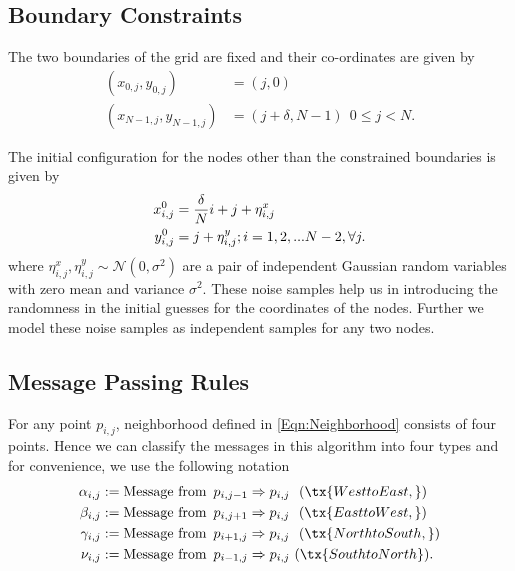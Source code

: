 \documentclass[journal, onecolumn]{IEEEtran}
\begin{document}
\subsection{Boundary Constraints}
The two boundaries of the grid are fixed and their co-ordinates are given by
\begin{align*}
(x_{0,j},y_{0,j})&=(j,0)  \\
(x_{N-1,j},y_{N-1,j})&=(j+\delta,N-1) ~~  0\leq j <N.
\end{align*}

The initial configuration for the nodes other than the constrained boundaries is given by
\begin{align}
x_{i,j}^{0}&=\frac{\delta}{N}i+j + \eta^{x}_{i,j} \notag\\
y_{i,j}^{0}&=j+\eta^{y}_{i,j};  i=1,2,...N-2,\forall j.\label{Eqn:InitialConfiguration}
\end{align}
where $\eta^{x}_{i,j},\eta^{y}_{i,j} \sim \mathcal{N}(0,\sigma^{2})$ are a pair of independent Gaussian random variables with zero mean and variance $ \sigma^{2}$. These noise samples help us in introducing the randomness in the initial guesses for the coordinates of the nodes. Further we model these noise samples as independent samples for any two nodes.

\subsection{Message Passing Rules}
For any point $p_{i,j}$, neighborhood defined in \eqref{Eqn:Neighborhood} consists of four points. Hence we can classify the messages in this algorithm into four types and for convenience, we use the following notation
\begin{align}
\alpha_{i,j} & := \text{Message from} \hspace{5pt} p_{i,j-1}\Rightarrow p_{i,j}~~ (\tx{West to East,})\notag \\
\beta_{i,j} & := \text{Message from} \hspace{5pt} p_{i,j+1}\Rightarrow p_{i,j}~~(\tx{East to West,})\notag \\
\gamma_{i,j} & := \text{Message from} \hspace{5pt} p_{i+1,j}\Rightarrow p_{i,j}~~(\tx{North to South,}) \notag \\
\nu_{i,j} & := \text{Message from} \hspace{5pt} p_{i-1,j}\Rightarrow p_{i,j}~(\tx{South to North}).
\label{Eqn:MessageTypesDefinition}
\end{align}
\end{document}
